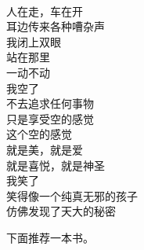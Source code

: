 \begin{poem}[笑]
    \begin{multicols}{4}
        \begin{center}~\\
            人在走，车在开 \\ 耳边传来各种嘈杂声 \\ 我闭上双眼 \\ 站在那里 \\ 一动不动 \\ 我空了 \\ 不去追求任何事物 \\ 只是享受空的感觉 \\ 这个空的感觉 \\ 就是美，就是爱 \\ 就是喜悦，就是神圣 \\ 我笑了 \\ 笑得像一个纯真无邪的孩子 \\ 仿佛发现了天大的秘密
        \end{center}
    \end{multicols}
\end{poem}

下面推荐一本书。

